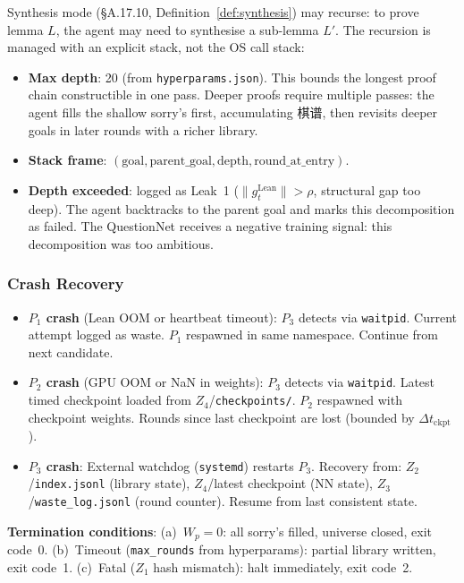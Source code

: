 \documentclass[11pt,a4paper]{article}
\theoremstyle{definition}
\theoremstyle{remark}
\begin{document}
Synthesis mode (\S A.17.10, Definition~\ref{def:synthesis}) may recurse: to prove lemma $L$, the agent may need to synthesise a sub-lemma $L'$. The recursion is managed with an explicit stack, not the OS call stack:
\begin{itemize}[nosep]
\item \textbf{Max depth}: 20 (from \texttt{hyperparams.json}). This bounds the longest proof chain constructible in one pass. Deeper proofs require multiple passes: the agent fills the shallow sorry's first, accumulating 棋谱, then revisits deeper goals in later rounds with a richer library.
\item \textbf{Stack frame}: $(\text{goal}, \text{parent\_goal}, \text{depth}, \text{round\_at\_entry})$.
\item \textbf{Depth exceeded}: logged as Leak~1 ($\|g_t^{\mathrm{Lean}}\| > \rho$, structural gap too deep). The agent backtracks to the parent goal and marks this decomposition as failed. The QuestionNet receives a negative training signal: this decomposition was too ambitious.
\end{itemize}


\subsubsection*{Crash Recovery}

\begin{itemize}[nosep]
\item \textbf{$P_1$ crash} (Lean OOM or heartbeat timeout): $P_3$ detects via \texttt{waitpid}. Current attempt logged as waste. $P_1$ respawned in same namespace. Continue from next candidate.
\item \textbf{$P_2$ crash} (GPU OOM or NaN in weights): $P_3$ detects via \texttt{waitpid}. Latest timed checkpoint loaded from $Z_4$/\texttt{checkpoints/}. $P_2$ respawned with checkpoint weights. Rounds since last checkpoint are lost (bounded by $\Delta t_{\mathrm{ckpt}}$).
\item \textbf{$P_3$ crash}: External watchdog (\texttt{systemd}) restarts $P_3$. Recovery from: $Z_2$/\texttt{index.jsonl} (library state), $Z_4$/latest checkpoint (NN state), $Z_3$/\texttt{waste\_log.jsonl} (round counter). Resume from last consistent state.
\end{itemize}

\textbf{Termination conditions}: (a)~$W_p = 0$: all sorry's filled, universe closed, exit code~0. (b)~Timeout (\texttt{max\_rounds} from hyperparams): partial library written, exit code~1. (c)~Fatal ($Z_1$ hash mismatch): halt immediately, exit code~2.
\end{document}
